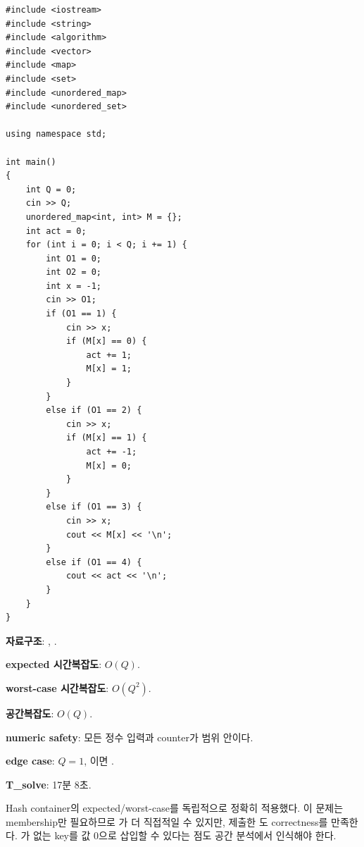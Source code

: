 \begin{answerbox}[학습자 제출 답안]
\begin{lstlisting}
#include <iostream>
#include <string>
#include <algorithm>
#include <vector>
#include <map>
#include <set>
#include <unordered_map>
#include <unordered_set>

using namespace std;

int main()
{
    int Q = 0;
    cin >> Q;
    unordered_map<int, int> M = {};
    int act = 0;
    for (int i = 0; i < Q; i += 1) {
        int O1 = 0;
        int O2 = 0;
        int x = -1;
        cin >> O1;
        if (O1 == 1) {
            cin >> x;
            if (M[x] == 0) {
                act += 1;
                M[x] = 1;
            }
        }
        else if (O1 == 2) {
            cin >> x;
            if (M[x] == 1) {
                act += -1;
                M[x] = 0;
            }
        }
        else if (O1 == 3) {
            cin >> x;
            cout << M[x] << '\n';
        }
        else if (O1 == 4) {
            cout << act << '\n';
        }
    }
}
\end{lstlisting}

\textbf{자료구조}: , .

\textbf{expected 시간복잡도}: $O(Q)$.

\textbf{worst-case 시간복잡도}: $O(Q^2)$.

\textbf{공간복잡도}: $O(Q)$.

\textbf{numeric safety}: 모든 정수 입력과 counter가  범위 안이다.

\textbf{edge case}: $Q=1$, 이면 .

\textbf{T\_solve}: 17분 8초.
\end{answerbox}

\begin{notebox}[당시 판정 --- PASS]
Hash container의 expected/worst-case를 독립적으로 정확히 적용했다. 이 문제는 membership만 필요하므로 가 더 직접적일 수 있지만, 제출한 도 correctness를 만족한다. 가 없는 key를 값 0으로 삽입할 수 있다는 점도 공간 분석에서 인식해야 한다.
\end{notebox}

